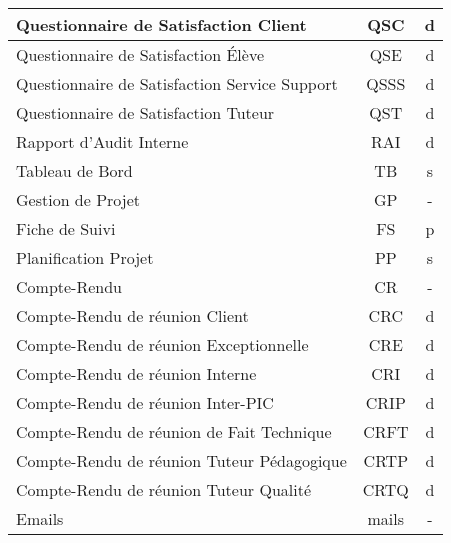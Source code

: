 \begin{longtable}{|p{12cm}|c|c|}
    \hline
    \hspace{2cm} Questionnaire de Satisfaction Client & QSC & d\\
    \hline
    \hspace{2cm} Questionnaire de Satisfaction Élève & QSE & d\\
    \hline
    \hspace{2cm} Questionnaire de Satisfaction Service Support & QSSS & d\\
    \hline
    \hspace{2cm} Questionnaire de Satisfaction Tuteur & QST & d\\    
    \hline
    \hspace{1cm} Rapport d'Audit Interne & RAI & d\\
    \hline
    \hspace{1cm} Tableau de Bord & TB & s\\
    \hline
    Gestion de Projet & GP & -\\
    \hline
    \hspace{1cm} Fiche de Suivi & FS & p\\
    \hline
    \hspace{1cm} Planification Projet & PP & s\\    
    \hline
    \hspace{1cm} Compte-Rendu & CR & -\\
    \hline
    \hspace{2cm} Compte-Rendu de réunion Client & CRC & d\\
    \hline
    \hspace{2cm} Compte-Rendu de réunion Exceptionnelle & CRE & d\\
    \hline
    \hspace{2cm} Compte-Rendu de réunion Interne & CRI & d\\
    \hline
    \hspace{2cm} Compte-Rendu de réunion Inter-PIC & CRIP & d\\
    \hline
    \hspace{2cm} Compte-Rendu de réunion de Fait Technique & CRFT & d\\
    \hline
    \hspace{2cm} Compte-Rendu de réunion Tuteur Pédagogique & CRTP & d\\
    \hline
    \hspace{2cm} Compte-Rendu de réunion Tuteur Qualité & CRTQ & d\\
    \hline
    \hspace{1cm} Emails & mails & -\\

\end{longtable}
